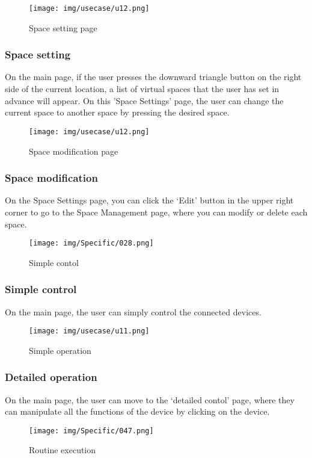 \documentclass[conference]{IEEEtran}
\begin{document}
\begin{figure}[h!]
\centering
\texttt{[image: img/usecase/u12.png]}
\caption{Space setting page}
\end{figure}
\subsubsection{Space setting}
On the main page, if the user presses the downward triangle button on the right side of the current location, a list of virtual spaces that the user has set in advance will appear. On this 'Space Settings' page, the user can change the current space to another space by pressing the desired space.
\clearpage

\begin{figure}[h!]
\centering
\texttt{[image: img/usecase/u12.png]}
\caption{Space modification page}
\end{figure}
\subsubsection{Space modification}
On the Space Settings page, you can click the `Edit' button in the upper right corner to go to the Space Management page, where you can modify or delete each space.
\vspace{1cm}
\begin{figure}[h!]
\centering
\texttt{[image: img/Specific/028.png]}
\caption{Simple contol}
\end{figure}
\subsubsection{Simple control}
On the main page, the user can simply control the connected devices.
\vspace{1cm}
\begin{figure}[h!]
\centering
\texttt{[image: img/usecase/u11.png]}
\caption{Simple operation}
\end{figure}
\subsubsection{Detailed operation}
On the main page, the user can move to the `detailed contol' page, where they can manipulate all the functions of the device by clicking on the device.

\begin{figure}[h!]
\centering
\texttt{[image: img/Specific/047.png]}
\caption{Routine execution}
\end{figure}
\end{document}
